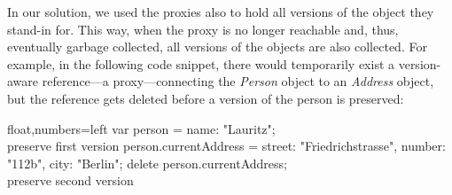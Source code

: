 % 
% 
% 
% 
% 
% 
% 
% 
% 
% 
% 
% 





In our solution, we used the proxies also to hold all versions of the object they stand-in for.
This way, when the proxy is no longer reachable and, thus, eventually garbage collected, all versions of the objects are also collected.
For example, in the following code snippet, there would temporarily exist a version-aware reference---a proxy---connecting the \emph{Person} object to an \emph{Address} object, but the reference gets deleted before a version of the person is preserved:

\begin{code}{}{float,numbers=left}
    var person = {name: "Lauritz"};
    \\ preserve first version
    person.currentAddress = {street: "Friedrichstrasse",
                         number: "112b",
                         city: "Berlin"};
    delete person.currentAddress;
    \\ preserve second version
\end{code}
\iffalse
\end{verbatim}\fi

